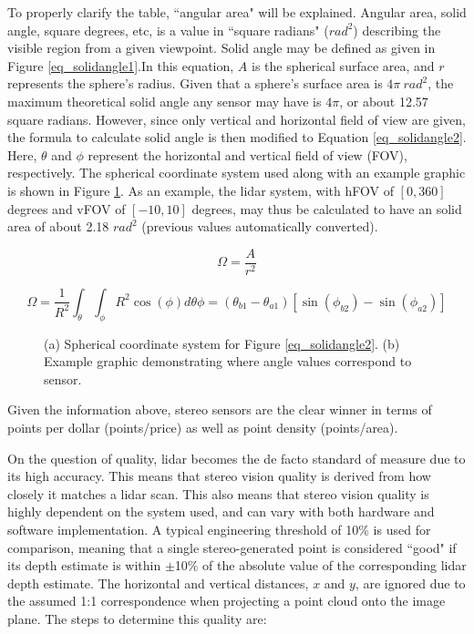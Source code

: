 To properly clarify the table, ``angular area" will be explained. Angular area, solid angle, square degrees, etc, is a value in ``square radians" ($rad^2$) describing the visible region from a given viewpoint. Solid angle may be defined as given in Figure \ref{eq_solidangle1}.In this equation, $A$ is the spherical surface area, and $r$ represents the sphere's radius. Given that a sphere's surface area is $4\pi \ rad^2$, the maximum theoretical solid angle any sensor may have is $4\pi$, or about 12.57 square radians. However, since only vertical and horizontal field of view are given, the formula to calculate solid angle is then modified to Equation \ref{eq_solidangle2}. Here, $\theta$ and $\phi$ represent the horizontal and vertical field of view (FOV), respectively. The spherical coordinate system used along with an example graphic is shown in Figure \ref{solidangle}. As an example, the lidar system, with hFOV of $[0,360]$ degrees and vFOV of $[-10,10]$ degrees, may thus be calculated to have an solid area of about 2.18 ${rad}^2$ (previous values automatically converted).

\begin{equation}
\Omega = \frac{A}{r^2}
\label{eq_solidangle1}
\end{equation}

\begin{equation}
\Omega = 
\frac{1}{R^2} \int_{\theta} \int_{\phi} R^2\cos(\phi) d\theta \phi = 
(\theta_{b1} - \theta_{a1})[\sin(\phi_{b2}) - \sin(\phi_{a2})]
\label{eq_solidangle2}
\end{equation}

\begin{figure}[h]
    \centering
    \caption{(a) Spherical coordinate system for Figure \ref{eq_solidangle2}. (b) Example graphic demonstrating where angle values correspond to sensor.}
    \label{solidangle}
\end{figure}

Given the information above, stereo sensors are the clear winner in terms of points per dollar (points/price) as well as point density (points/area).

On the question of quality, lidar becomes the de facto standard of measure due to its high accuracy. 
This means that stereo vision quality is derived from how closely it matches a lidar scan. This also means that stereo vision quality is highly dependent on the system used, and can vary with both hardware and software implementation. A typical engineering threshold of 10\% is used for comparison, meaning that a single stereo-generated point is considered ``good" if its depth estimate is within $\pm$10\% of the absolute value of the corresponding lidar depth estimate. The horizontal and vertical distances, $x$ and $y$, are ignored due to the assumed 1:1 correspondence when projecting a point cloud onto the image plane. The steps to determine this quality are:

